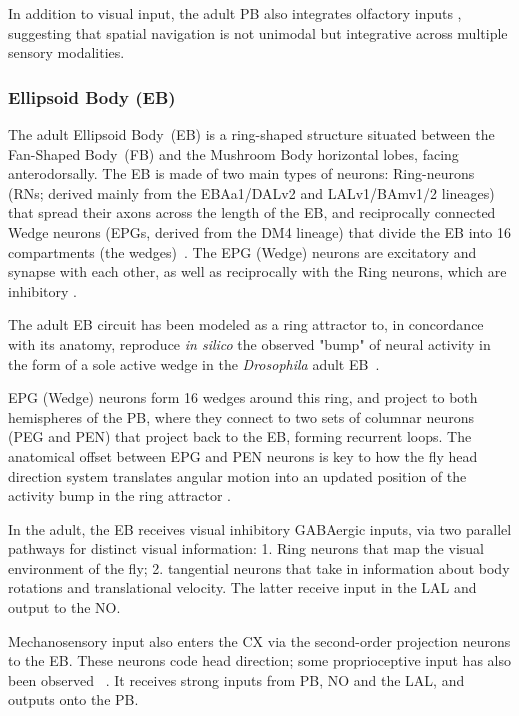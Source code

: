         In addition to visual input, the adult PB also integrates olfactory inputs \citep{hulse2021connectome}, suggesting that spatial navigation is not unimodal but integrative across multiple sensory modalities.
        \subsubsection{Ellipsoid Body (EB)}
        The adult Ellipsoid Body~(EB) is a ring-shaped structure situated between the Fan-Shaped Body~(FB) and the Mushroom Body horizontal lobes, facing anterodorsally.
        The EB is made of two main types of neurons: Ring-neurons (RNs; derived mainly from the EBAa1/DALv2 and LALv1/BAmv1/2 lineages) that spread their axons across the length of the EB, and reciprocally connected Wedge neurons (EPGs, derived from the DM4 lineage) that divide the EB into 16 compartments (the wedges)~\citep{wolff2015neuroarchitecture}.
        The EPG (Wedge) neurons are excitatory and synapse with each other, as well as reciprocally with the Ring neurons, which are inhibitory \citep{franconville2018building, hulse2021connectome}.

        The adult EB circuit has been modeled as a ring attractor \citep{Stone2017CXModel} to, in concordance with its anatomy, reproduce \textit{in silico} the observed "bump" of neural activity in the form of a sole active wedge in the \textit{Drosophila} adult EB~\citep{seelig2015neural}.

        EPG (Wedge) neurons form 16 wedges around this ring, and project to both hemispheres of the PB, where they connect to two sets of columnar neurons (PEG and PEN) that project back to the EB, forming recurrent loops.
        The anatomical offset between EPG and PEN neurons is key to how the fly head direction system translates angular motion into an updated position of the activity bump in the ring attractor \citep{Stone2017CXModel}.

        In the adult, the EB receives visual inhibitory GABAergic inputs, via two parallel pathways for distinct visual information: 1. Ring neurons that map the visual environment of the fly; 2. tangential neurons that take in information about body rotations and translational velocity. The latter receive input in the LAL and output to the NO.

        Mechanosensory input also enters the CX via the second-order projection neurons to the EB. These neurons code head direction; some proprioceptive input has also been observed ~\citep{hulse2021connectome}. It receives strong inputs from PB, NO and the LAL, and outputs onto the PB.

